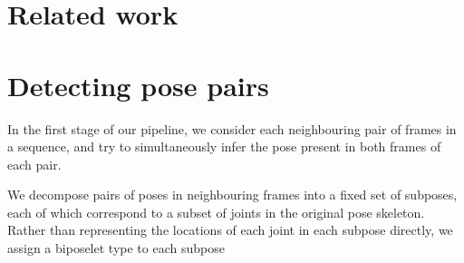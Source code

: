\documentclass[runningheads]{llncs}
\begin{document}
\section{Related work}


\section{Detecting pose pairs}


In the first stage of our pipeline, we consider each neighbouring pair of frames
in a sequence, and try to simultaneously infer the pose present in both frames
of each pair. %

We decompose pairs of poses in neighbouring frames into a fixed set of subposes,
each of which correspond to a subset of joints in the original pose skeleton.
Rather than representing the locations of each joint in each subpose directly,
we assign a biposelet type to each subpose %
\end{document}
